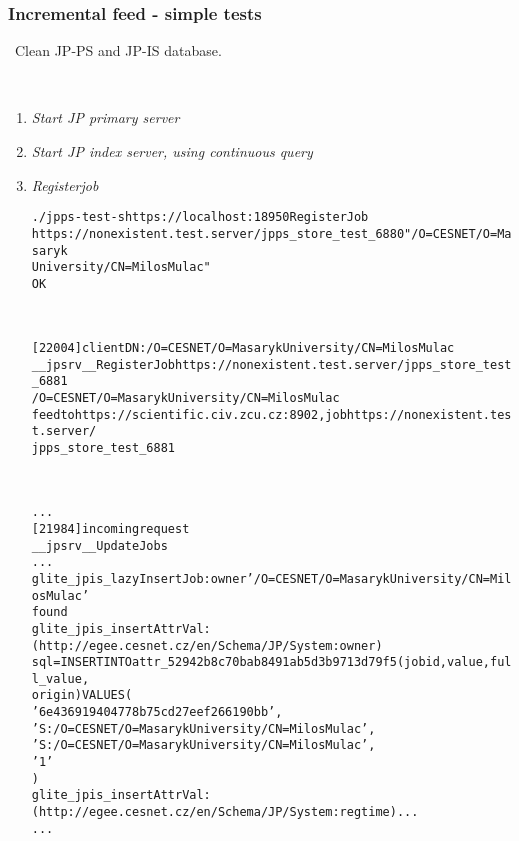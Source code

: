 \subsubsection{Incremental feed - simple tests}

\req\ Clean JP-PS and JP-IS database.

\how\
\begin{enumerate}
 \item \emph{Start JP primary server}
 \item \emph{Start JP index server, using continuous query}
 \item \emph{Registerjob}
  \begin{alltt}
	./jpps-test -s https://localhost:18950 RegisterJob 
	https://nonexistent.test.server/jpps_store_test_6880 "/O=CESNET/O=Masaryk 
	University/CN=Milos Mulac"
	OK
  \end{alltt}
  \jpps\
  \begin{alltt}
	[22004] client DN: /O=CESNET/O=Masaryk University/CN=Milos Mulac
	__jpsrv__RegisterJob https://nonexistent.test.server/jpps_store_test_6881 
	/O=CESNET/O=Masaryk University/CN=Milos Mulac
	feed to https://scientific.civ.zcu.cz:8902, job https://nonexistent.test.server/
	jpps_store_test_6881
  \end{alltt}
  \jpis\
  \begin{alltt}
	...
	[21984] incoming request
	__jpsrv__UpdateJobs
	...
	glite_jpis_lazyInsertJob: owner '/O=CESNET/O=Masaryk University/CN=Milos Mulac'
	found
	glite_jpis_insertAttrVal: (http://egee.cesnet.cz/en/Schema/JP/System:owner) 
	sql=INSERT INTO attr_52942b8c70bab8491ab5d3b9713d79f5 (jobid, value, full_value, 
	origin) VALUES (
        '6e436919404778b75cd27eef266190bb',
        'S:/O=CESNET/O=Masaryk University/CN=Milos Mulac',
        'S:/O=CESNET/O=Masaryk University/CN=Milos Mulac',
        '1'
)
	glite_jpis_insertAttrVal: (http://egee.cesnet.cz/en/Schema/JP/System:regtime) ...
	...
  \end{alltt}


\end{enumerate}
